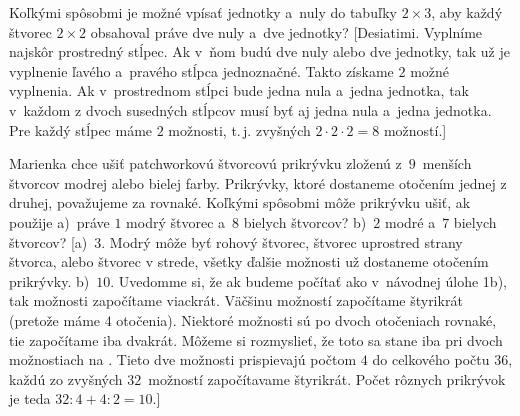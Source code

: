 {Koľkými spôsobmi je možné vpísať jednotky a~nuly do tabuľky $2\times 3$, aby každý štvorec $2\times 2$ obsahoval práve dve nuly a~dve jednotky? [Desiatimi. Vyplníme najskôr prostredný stĺpec. Ak v~ňom budú dve nuly alebo dve jednotky, tak už je vyplnenie ľavého a~pravého stĺpca jednoznačné. Takto získame $2$ možné vyplnenia. Ak v~prostrednom stĺpci bude jedna nula a~jedna jednotka, tak v~každom z dvoch susedných stĺpcov musí byť aj jedna nula a~jedna jednotka. Pre každý stĺpec máme $2$ možnosti, t.\,j. zvyšných $2\cdot2\cdot2=8$ možností.]

\D
Marienka chce ušiť patchworkovú štvorcovú prikrývku zloženú z~$9$~menších štvorcov modrej alebo bielej farby. Prikrývky, ktoré dostaneme otočením jednej z druhej, považujeme za rovnaké. Koľkými spôsobmi môže prikrývku ušiť, ak použije
a)~práve $1$ modrý štvorec a~$8$ bielych štvorcov?
b)~$2$ modré a~$7$ bielych štvorcov? [a)~$3$.
Modrý môže byť rohový štvorec, štvorec uprostred strany štvorca, alebo štvorec v strede, všetky ďalšie možnosti už dostaneme otočením prikrývky.
b)~$10$. Uvedomme si, že ak budeme počítať ako v~návodnej úlohe 1b), tak možnosti započítame viackrát. Väčšinu možností započítame štyrikrát (pretože máme $4$ otočenia). Niektoré možnosti sú po dvoch otočeniach rovnaké, tie započítame iba dvakrát. Môžeme si rozmyslieť, že toto sa stane iba pri dvoch možnostiach na \obr{}.
%
Tieto dve možnosti prispievajú počtom $4$ do celkového počtu $36$, každú zo zvyšných $32$~možností započítavame štyrikrát. Počet rôznych prikrývok je teda $32:4+4:2=10$.]

}
